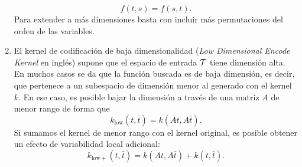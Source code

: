 \begin{enumerate}
	\begin{equation*}
		f(t, s) = f(s, t).
	\end{equation*}
	Para extender a más dimensiones basta con incluir más permutaciones del orden de las variables.
	\item El kernel de codificación de baja dimensionalidad (\emph{Low Dimensional Encode Kernel} en inglés) supone que el espacio de entrada \(\mathcal{T}\) tiene dimensión alta. En muchos casos se da que la función buscada es de baja dimensión, es decir, que pertenece a un subespacio de dimensión menor al generado con el kernel \(k\). En ese caso, es posible bajar la dimensión a través de una matriz \(A\) de menor rango de forma que
	\begin{equation*}
		k_{\mathrm{low}}(t, \bar{t}) = k(At, A\bar{t}).
	\end{equation*}
	Si sumamos el kernel de menor rango con el kernel original, es posible obtener un efecto de variabilidad local adicional:
	\begin{equation*}
		k_{\mathrm{low+}}(t, \bar{t}) = k(At, A\bar{t}) + k(t, \bar{t}).
	\end{equation*}
\end{enumerate}


